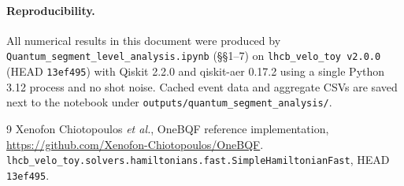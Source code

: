 \documentclass[a4paper,11pt]{article}
\begin{document}
\paragraph{Reproducibility.} All numerical results in this document were produced by
\texttt{Quantum\_segment\_level\_analysis.ipynb} (\S\S1--7) on
\texttt{lhcb\_velo\_toy v2.0.0} (HEAD \texttt{13ef495}) with Qiskit 2.2.0 and qiskit-aer
0.17.2 using a single Python 3.12 process and no shot noise. Cached event data and
aggregate CSVs are saved next to the notebook under
\texttt{outputs/quantum\_segment\_analysis/}.

\begin{thebibliography}{9}
 Xenofon Chiotopoulos \emph{et al.}, OneBQF reference implementation,
  \url{https://github.com/Xenofon-Chiotopoulos/OneBQF}.
 \texttt{lhcb\_velo\_toy.solvers.hamiltonians.fast.SimpleHamiltonianFast},
  HEAD \texttt{13ef495}.
\end{thebibliography}
\end{document}
